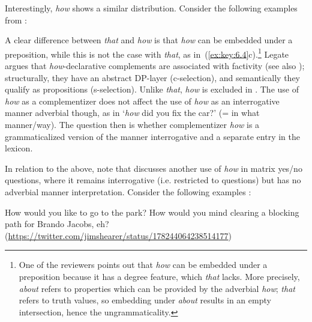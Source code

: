 \documentclass[output=paper]{langsci/langscibook}
\begin{document}
Interestingly,  \emph{how} shows a similar distribution. Consider the
following examples from \citet[122]{Legate2010}:

\ea\label{ex:key:6.4}
	\z
\z

A clear difference between \emph{that} and \emph{how} is that \emph{how}
can be embedded under a preposition, while this is not the case with
\emph{that}, as in~(\ref{ex:key:6.4}c).\footnote{One of the reviewers points out that
\emph{how} can be embedded under a preposition because it has a degree
feature, which \emph{that} lacks. More precisely, \emph{about} refers to
properties which can be provided by the adverbial \emph{how}; \emph{that}
refers to truth values, so embedding under \emph{about} results in an empty
intersection, hence the ungrammaticality.}  Legate argues that
\emph{how}{}-declarative complements are associated with factivity (see also
\citealt{Nye2013}); structurally, they have an abstract DP-layer (c-selection),
and semantically they qualify as propositions (s-selection). Unlike
\emph{that}, \emph{how} is excluded in . The use of
\emph{how} as a complementizer does not affect the use of \emph{how} as an
interrogative manner adverbial though, as in ‘\emph{how} did you fix the
car?’ (= in what manner/way). The question then is whether complementizer
\emph{how} is a grammaticalized version of the manner interrogative and a
separate entry in the lexicon.

In relation to the above, note that \citet{vanGelderen2015} discusses another
use of \emph{how} in matrix yes/no questions, where it remains interrogative
(i.e. restricted to questions) but has no adverbial manner interpretation.
Consider the following examples \parencite[164--165]{vanGelderen2015}:

\ea\label{ex:key:6.5}
	\ea How would you like to go to the park?
	\ex How would you mind clearing a blocking path for Brando Jacobs, eh?
		(\url{https://twitter.com/jimshearer/status/178244064238514177})
	\z
\z
\end{document}
